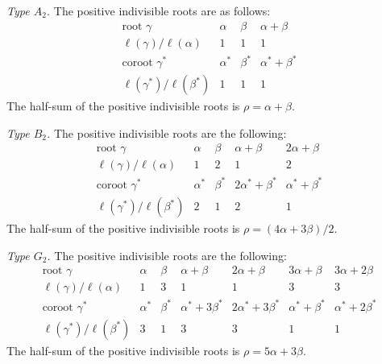 \emph{Type $A_2$.} The positive indivisible roots are as follows:
\[
\begin{array}{c|ccc}
\text{root }\gamma&\alpha&\beta&\alpha+\beta\\\hline
\ell(\gamma)/\ell(\alpha)&1&1&1\\\hline
\text{coroot }\gamma^*&\alpha^*&\beta^*&\alpha^*+\beta^*\\\hline
\ell(\gamma^*)/\ell(\beta^*)&1&1&1
\end{array}
\]
The half-sum of the positive indivisible roots is $\rho=\alpha+\beta$.

\emph{Type $B_2$.} The positive indivisible roots are the following:
\[
\begin{array}{c|cccc}
\text{root }\gamma&\alpha&\beta&\alpha+\beta&2\alpha+\beta\\\hline
\ell(\gamma)/\ell(\alpha)&1&2&1&2\\\hline
\text{coroot }\gamma^*&\alpha^*&\beta^*&2\alpha^*+\beta^*&\alpha^*+\beta^*\\\hline
\ell(\gamma^*)/\ell(\beta^*)&2&1&2&1
\end{array}
\]
The half-sum of the positive indivisible roots is $\rho=(4\alpha+3\beta)/2$.

\emph{Type $G_2$.} The positive indivisible roots are the following:
\[
\begin{array}{c|cccccc}
\text{root }\gamma&\alpha&\beta&\alpha+\beta&2\alpha+\beta&3\alpha+\beta&3\alpha+2\beta\\\hline
\ell(\gamma)/\ell(\alpha)&1&3&1&1&3&3\\\hline
\text{coroot }\gamma^*&\alpha^*&\beta^*&\alpha^*+3\beta^*&2\alpha^*+3\beta^*&\alpha^*+\beta^*&\alpha^*+2\beta^*\\\hline
\ell(\gamma^*)/\ell(\beta^*)&3&1&3&3&1&1
\end{array}
\]
The half-sum of the positive indivisible roots is $\rho=5\alpha+3\beta$.


